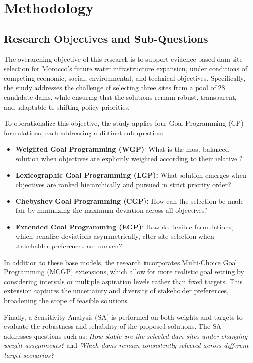 \section{Methodology}\label{sec:methodology}

\subsection*{Research Objectives and Sub-Questions}
The overarching objective of this research is to support evidence-based dam site selection 
for Morocco’s future water infrastructure expansion, under conditions of competing 
economic, social, environmental, and technical objectives. Specifically, the study addresses the challenge of selecting three sites from a pool of 28 candidate dams, while ensuring that the solutions remain robust, transparent, and adaptable to shifting policy priorities.

To operationalize this objective, the study applies four Goal Programming (GP) formulations, 
each addressing a distinct sub-question:

\begin{itemize}
    \item \textbf{Weighted Goal Programming (WGP):} What is the most balanced solution when 
    objectives are explicitly weighted according to their relative      ?
    \item \textbf{Lexicographic Goal Programming (LGP):} What solution emerges when objectives 
    are ranked hierarchically and pursued in strict priority order?
    \item \textbf{Chebyshev Goal Programming (CGP):} How can the selection be made fair by 
    minimizing the maximum deviation across all objectives?
    \item \textbf{Extended Goal Programming (EGP):} How do flexible formulations, which 
    penalize deviations asymmetrically, alter site selection when stakeholder preferences 
    are uneven?
\end{itemize}

In addition to these base models, the research incorporates Multi-Choice Goal Programming (MCGP) extensions, which allow for more realistic goal setting by considering intervals or multiple aspiration levels rather than fixed targets. This extension captures the uncertainty and diversity of stakeholder preferences, broadening the scope of feasible solutions.

Finally, a Sensitivity Analysis (SA) is performed on both weights and targets to 
evaluate the robustness and reliability of the proposed solutions. The SA addresses questions 
such as: \textit{How stable are the selected dam sites under changing weight assignments?} and 
\textit{Which dams remain consistently selected across different target scenarios?}

